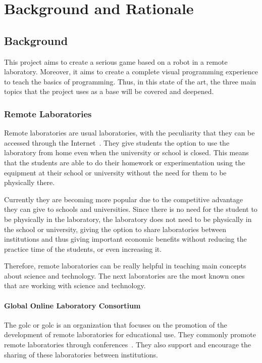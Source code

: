 \chapter{Background and Rationale}

\section{Background}

This project aims to create a serious game based on a robot in a remote laboratory. Moreover, it
aims to create a complete visual programming experience to teach the basics of programming. Thus,
in this state of the art, the three main topics that the project uses as a base will be covered and
deepened.

\subsection{Remote Laboratories}

Remote laboratories are usual laboratories, with the peculiarity that they can be accessed through
the Internet~\cite{remote_labs}. They give students the option to use the laboratory from home even
when the university or school is closed. This means that the students are able to do their homework
or experimentation using the equipment at their school or university without the need for them to be
physically there.

Currently they are becoming more popular due to the competitive advantage they can give to schools
and universities. Since there is no need for the student to be physically in the laboratory, the
laboratory does not need to be physically in the school or university, giving the option to share
laboratories between institutions and thus giving important economic benefits without reducing
the practice time of the students, or even increasing it.

Therefore, remote laboratories can be really helpful in teaching main concepts about science and
technology. The next laboratories are the most known ones that are working with science and
technology.

\subsubsection{Global Online Laboratory Consortium}

The \acrlong{golc} or \acrshort{golc} is an organization that focuses on the promotion of the
development of remote laboratories for educational use. They commonly promote remote laboratories
through conferences~\cite{golc1st}. They also support and encourage the sharing of these
laboratories between institutions.

